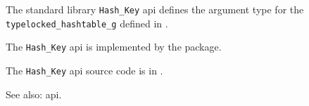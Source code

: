 
The standard library {\tt Hash\_Key} api defines the argument type for the 
{\tt typelocked\_hashtable\_g} defined in .

The {\tt Hash\_Key} api is implemented by the  package.

The {\tt Hash\_Key} api source code is in .

See also:   api.





